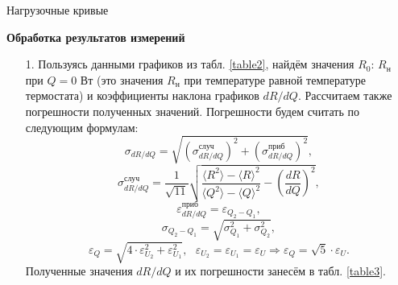 \documentclass[a4paper, 12pt]{article}
\begin{document}
\begin{table}
        \caption{Нагрузочные кривые}
        \label{table2}
    \end{table}
    
    \newpage
    
    \begin{center}
        {\Large {\bf Обработка результатов измерений}}
    \end{center}
    
    \begin{enumerate}
    
        \item[1.] Пользуясь данными графиков из табл. \ref{table2}, найдём значения $R_0$: $R_н$ при $Q = 0$ Вт (это значения $R_н$ при температуре равной температуре термостата) и коэффициенты наклона графиков $dR / dQ$. Рассчитаем также погрешности полученных значений. Погрешности будем считать по следующим формулам:
        \begin{equation}
            \sigma_{dR / dQ} = \sqrt{(\sigma_{dR / dQ}^{случ})^2 + (\sigma_{dR / dQ}^{приб})^2},
        \end{equation}
        \begin{equation}
            \sigma_{dR / dQ}^{случ} = \frac{1}{\sqrt{11}} \sqrt{\frac{\langle R^2 \rangle - \langle R \rangle^2}{\langle Q^2 \rangle - \langle Q \rangle^2} - (\frac{dR}{dQ})^2},
        \end{equation}
        \begin{equation}
            \varepsilon_{dR / dQ}^{приб} = \varepsilon_{Q_2 - Q_1},
        \end{equation}
        \begin{equation}
            \sigma_{Q_2 - Q_1} = \sqrt{\sigma_{Q_1}^2 + \sigma_{Q_2}^2},
        \end{equation}
        \begin{equation}
            \varepsilon_Q = \sqrt{4 \cdot \varepsilon_{U_2}^2 + \varepsilon_{U_1}^2}, \text{ } \varepsilon_{U_2} = \varepsilon_{U_1} = \varepsilon_{U} \Rightarrow \varepsilon_Q = \sqrt{5} \cdot \varepsilon_{U}.
        \end{equation}
        Полученные значения $dR / dQ$ и их погрешности занесём в табл. \ref{table3}.
        

\end{enumerate}
\end{document}
